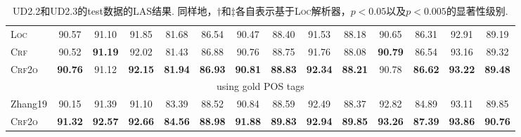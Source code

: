 \begin{table*}[tb]
\begin{tabularx}{\textwidth}{lccccccccccccc}
        \textsc{Loc}                  & 90.57          & 91.10          & 91.85                            & 81.68                           & 86.54                           & 90.47                            & 88.40                           & 91.53                            & 88.18                            & 90.65                           & 86.31                            & 92.91                            & 89.19                            \\
        \textsc{Crf}                  & 90.52          & \textbf{91.19} & 92.02                            & 81.43                           & 86.88\rlap{$^\dagger$}          & 90.76\rlap{$^\dagger$}           & 88.75                           & 91.76                            & 88.08                            & \textbf{90.79}                  & 86.54                            & 93.16\rlap{$^\ddagger$}          & 89.32\rlap{$^\ddagger$}          \\
        \textsc{Crf2o}                & \textbf{90.76} & 91.12          & \textbf{92.15}\rlap{$^\ddagger$} & \textbf{81.94}                  & \textbf{86.93}\rlap{$^\dagger$} & \textbf{90.81}\rlap{$^\ddagger$} & \textbf{88.83}\rlap{$^\dagger$} & \textbf{92.34}\rlap{$^\ddagger$} & \textbf{88.21}\rlap{$^\dagger$}  & 90.78                           & \textbf{86.62}                   & \textbf{93.22}\rlap{$^\ddagger$} & \textbf{89.48}\rlap{$^\ddagger$} \\
        \multicolumn{14}{c}{using gold POS tags}                                                                                                                                                                                                                                                                                                                                                                                                                     \\[1pt]
        Zhang19                       & 90.15          & 91.39          & 91.10                            & 83.39                           & 88.52                           & 90.84                            & 88.59                           & 92.49                            & 88.37                            & 92.82                           & 84.89                            & 93.11                            & 89.85                            \\
        \textsc{Crf2o}                & \textbf{91.32} & \textbf{92.57} & \textbf{92.66}                   & \textbf{84.56}                  & \textbf{88.98}                  & \textbf{91.88}                   & \textbf{89.83}                  & \textbf{92.94}                   & \textbf{89.85}                   & \textbf{93.26}                  & \textbf{87.39}                   & \textbf{93.86}                   & \textbf{90.76}                   \\
        \bottomrule
    \end{tabularx}
    \caption{UD2.2和UD2.3的test数据的LAS结果.
        同样地，$\dagger$和$\ddagger$各自表示基于\textsc{Loc}解析器，$p<0.05$以及$p<0.005$的显著性级别. }
    \label{table:ud-test}
\end{table*}

